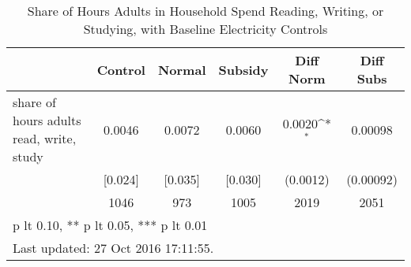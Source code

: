 \begin{table}[htbp]\centering
\def\sym#1{\ifmmode^{#1}\else\(^{#1}\)\fi}
\caption{Share of Hours Adults in Household Spend Reading, Writing, or Studying, with Baseline Electricity Controls \label{tab:"balance"}}
\begin{tabular*}{0.9\hsize}{@{\hskip\tabcolsep\extracolsep\fill}l*{1}{ccccc}}
\toprule
                                &  Control&   Normal&  Subsidy&Diff Norm         &Diff Subs         \\
\midrule
share of hours adults read, write, study&   0.0046&   0.0072&   0.0060&   0.0020\sym{*}  &  0.00098         \\
                                &  [0.024]&  [0.035]&  [0.030]& (0.0012)         &(0.00092)         \\
                                &     1046&      973&     1005&     2019         &     2051         \\
\bottomrule
\multicolumn{6}{l}{\footnotesize * p lt 0.10, ** p lt 0.05, *** p lt 0.01}\\
\multicolumn{6}{l}{\footnotesize Last updated: 27 Oct 2016 17:11:55.}\\
\end{tabular*}
\end{table}
